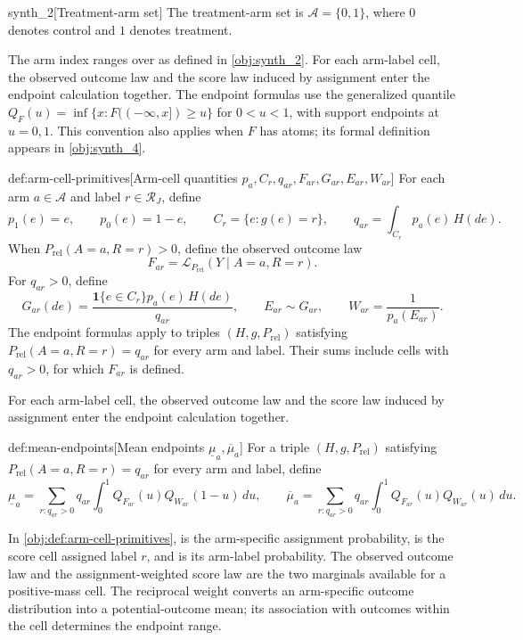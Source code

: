 \documentclass[11pt]{article}
\begin{document}
\begin{definitionv}{synth_2}[Treatment-arm set]
The treatment-arm set is \(\mathcal A=\{0,1\}\), where \(0\) denotes control and \(1\) denotes treatment.
\end{definitionv}

The arm index  ranges over  as defined in \cref{obj:synth_2}. For each arm-label cell, the observed outcome law and the score law induced by assignment enter the endpoint calculation together.
The endpoint formulas use the generalized quantile \(Q_F(u)=\inf\{x:F((-\infty,x])\ge u\}\) for \(0<u<1\), with support endpoints at \(u=0,1\). This convention also applies when \(F\) has atoms; its formal definition appears in \cref{obj:synth_4}.

\begin{definitionv}{def:arm-cell-primitives}[Arm-cell quantities $p_a,C_r,q_{ar},F_{ar},G_{ar},E_{ar},W_{ar}$]
For each arm \(a\in\mathcal A\) and label \(r\in\mathcal R_J\), define
\[
p_1(e)=e,\qquad p_0(e)=1-e,\qquad
C_r=\{e:g(e)=r\},\qquad
q_{ar}=\int_{C_r}p_a(e)\,H(de).
\]
When \(P_{\mathrm{rel}}(A=a,R=r)>0\), define the observed outcome law
\[
F_{ar}=\mathcal L_{P_{\mathrm{rel}}}(Y\mid A=a,R=r).
\]
For \(q_{ar}>0\), define
\[
G_{ar}(de)=\frac{\mathbf 1\{e\in C_r\}p_a(e)\,H(de)}{q_{ar}},
\qquad E_{ar}\sim G_{ar},
\qquad W_{ar}=\frac{1}{p_a(E_{ar})}.
\]
The endpoint formulas apply to triples \((H,g,P_{\mathrm{rel}})\) satisfying \(P_{\mathrm{rel}}(A=a,R=r)=q_{ar}\) for every arm and label. Their sums include cells with \(q_{ar}>0\), for which \(F_{ar}\) is defined.
\end{definitionv}

For each arm-label cell, the observed outcome law and the score law induced by assignment enter the endpoint calculation together.

\begin{definitionv}{def:mean-endpoints}[Mean endpoints $\underline\mu_a,\overline\mu_a$]
For a triple \((H,g,P_{\mathrm{rel}})\) satisfying \(P_{\mathrm{rel}}(A=a,R=r)=q_{ar}\) for every arm and label, define
\[
\underline\mu_a
=\sum_{r:q_{ar}>0}q_{ar}\int_0^1
Q_{F_{ar}}(u)Q_{W_{ar}}(1-u)\,du,
\qquad
\overline\mu_a
=\sum_{r:q_{ar}>0}q_{ar}\int_0^1
Q_{F_{ar}}(u)Q_{W_{ar}}(u)\,du.
\]
\end{definitionv}

In \cref{obj:def:arm-cell-primitives},  is the arm-specific assignment probability,  is the score cell assigned label \(r\), and  is its arm-label probability. The observed outcome law  and the assignment-weighted score law  are the two marginals available for a positive-mass cell. The reciprocal weight  converts an arm-specific outcome distribution into a potential-outcome mean; its association with outcomes within the cell determines the endpoint range.
\end{document}
